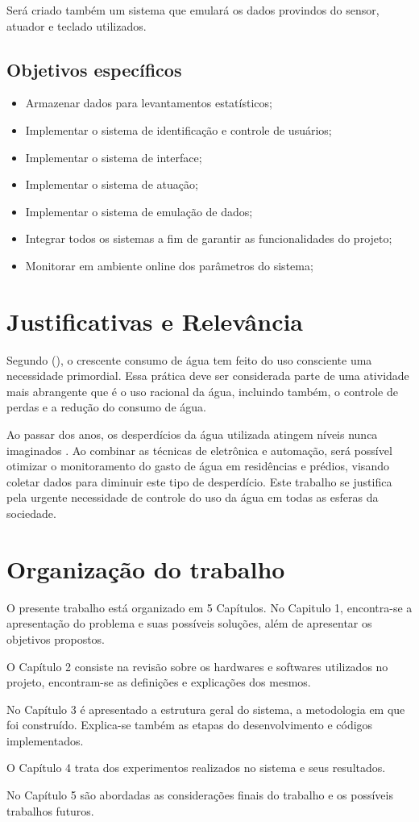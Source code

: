 Será criado também um sistema que emulará os dados provindos do sensor, atuador e teclado utilizados.

\subsection{Objetivos específicos}

\begin{itemize}
	\item Armazenar dados para levantamentos estatísticos;
	\item Implementar o sistema de identificação e controle de usuários;
	\item Implementar o sistema de interface;
	\item Implementar o sistema de atuação;
	\item Implementar o sistema de emulação de dados;
	\item Integrar todos os sistemas a fim de garantir as funcionalidades do projeto;
	\item Monitorar em ambiente online dos parâmetros do sistema;
\end{itemize}

\section{Justificativas e Relev{\^a}ncia}
%
Segundo \citeauthor{AlvesDaSilva} (\citeyear{AlvesDaSilva}), o crescente consumo de água
tem feito do uso consciente uma necessidade primordial. Essa prática deve ser considerada parte de uma atividade mais abrangente que é o uso racional da água, incluindo também, o controle de perdas e a redução do consumo de água.

Ao passar dos anos, os desperdícios da água utilizada atingem níveis nunca imaginados \cite{rebouccas2003agua}. Ao combinar as técnicas de eletrônica e automação, será possível otimizar o monitoramento do gasto de água em residências e prédios, visando coletar dados para diminuir este tipo de desperdício. Este trabalho se justifica pela urgente necessidade de controle do uso da água em todas as esferas da sociedade. 
%
\section{Organização do trabalho}

O presente trabalho está organizado em 5 Capítulos. No Capitulo 1, encontra-se a apresentação do problema e suas possíveis soluções, além de apresentar os objetivos propostos.

O Capítulo 2 consiste na revisão sobre os hardwares e softwares utilizados no projeto, encontram-se as definições e explicações dos mesmos.

No Capítulo 3 é apresentado a estrutura geral do sistema, a metodologia em que foi construído. Explica-se também as etapas do desenvolvimento e códigos implementados.

O Capítulo 4 trata dos experimentos realizados no sistema e seus resultados.

No Capítulo 5 são abordadas as considerações finais do trabalho e os possíveis trabalhos futuros.